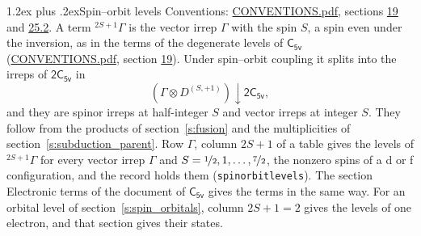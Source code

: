 \documentclass[10pt,a4paper]{article}
\makeatletter
\renewcommand\section{\@startsection{section}{1}{\z@}{-3ex plus -1ex minus -.2ex}%
  {1.2ex plus .2ex}{\normalfont\large\sffamily\bfseries\color{parttitle}}}
\numberwithin{equation}{section}
\newcommand{\grp}[1]{\mathsf{#1}}
\newcommand{\restr}[2]{#1\!\downarrow#2}
\newcommand{\irrJp}[2]{D^{(#1,#2)}}
\newcommand{\irrprod}{\otimes}
\newcommand{\term}[2]{{}^{#1}#2}
\makeatother
\begin{document}
\section{Spin--orbit levels}\label{s:spin_orbit}
Conventions: \href{../../CONVENTIONS.pdf}{CONVENTIONS.pdf}, sections \href{../../../rotation/CONVENTIONS.pdf\#conv.19}{19} and \href{../../CONVENTIONS.pdf\#conv.25.2}{25.2}.
\leavevmode\label{n:local.spin}\label{n:symbol.term}A term $\term{2S+1}{\Gamma}$ is the vector irrep $\Gamma$ with the spin $S$, a spin even under the inversion, as in the terms of the degenerate levels of \href{../../../rotation/data/pdf/C5v.pdf}{$\grp{C_{5v}}$} (\href{../../CONVENTIONS.pdf}{CONVENTIONS.pdf}, section \href{../../../rotation/CONVENTIONS.pdf\#conv.19}{19}). Under spin--orbit coupling it splits into the irreps of $\grp{2C_{5v}}$ in
\begin{equation}\label{e:spinorbit}\restr{(\Gamma \irrprod \irrJp{S}{+1})}{\grp{2C_{5v}}},\end{equation}
and they are spinor irreps at half-integer $S$ and vector irreps at integer $S$. They follow from the products of section~\ref{s:fusion} and the multiplicities of section~\ref{s:subduction_parent}. Row $\Gamma$, column $2S + 1$ of a table gives the levels of $\term{2S+1}{\Gamma}$ for every vector irrep $\Gamma$ and $S = \nicefrac{1}{2}, 1, \dots, \nicefrac{7}{2}$, the nonzero spins of a d or f configuration, and the record holds them (\texttt{spinorbitlevels}). The section Electronic terms of the document of \href{../../../rotation/data/pdf/C5v.pdf}{$\grp{C_{5v}}$} gives the terms in the same way. For an orbital level of section~\ref{s:spin_orbitals}, column $2S + 1 = 2$ gives the levels of one electron, and that section gives their states.
\end{document}
